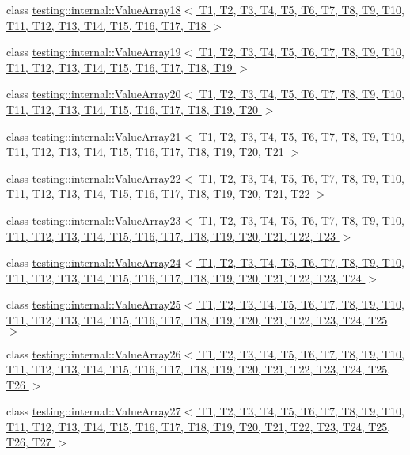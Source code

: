 \begin{DoxyCompactItemize}
\item 
class \hyperlink{classtesting_1_1internal_1_1_value_array18}{testing\-::internal\-::\-Value\-Array18$<$ T1, T2, T3, T4, T5, T6, T7, T8, T9, T10, T11, T12, T13, T14, T15, T16, T17, T18 $>$}
\item 
class \hyperlink{classtesting_1_1internal_1_1_value_array19}{testing\-::internal\-::\-Value\-Array19$<$ T1, T2, T3, T4, T5, T6, T7, T8, T9, T10, T11, T12, T13, T14, T15, T16, T17, T18, T19 $>$}
\item 
class \hyperlink{classtesting_1_1internal_1_1_value_array20}{testing\-::internal\-::\-Value\-Array20$<$ T1, T2, T3, T4, T5, T6, T7, T8, T9, T10, T11, T12, T13, T14, T15, T16, T17, T18, T19, T20 $>$}
\item 
class \hyperlink{classtesting_1_1internal_1_1_value_array21}{testing\-::internal\-::\-Value\-Array21$<$ T1, T2, T3, T4, T5, T6, T7, T8, T9, T10, T11, T12, T13, T14, T15, T16, T17, T18, T19, T20, T21 $>$}
\item 
class \hyperlink{classtesting_1_1internal_1_1_value_array22}{testing\-::internal\-::\-Value\-Array22$<$ T1, T2, T3, T4, T5, T6, T7, T8, T9, T10, T11, T12, T13, T14, T15, T16, T17, T18, T19, T20, T21, T22 $>$}
\item 
class \hyperlink{classtesting_1_1internal_1_1_value_array23}{testing\-::internal\-::\-Value\-Array23$<$ T1, T2, T3, T4, T5, T6, T7, T8, T9, T10, T11, T12, T13, T14, T15, T16, T17, T18, T19, T20, T21, T22, T23 $>$}
\item 
class \hyperlink{classtesting_1_1internal_1_1_value_array24}{testing\-::internal\-::\-Value\-Array24$<$ T1, T2, T3, T4, T5, T6, T7, T8, T9, T10, T11, T12, T13, T14, T15, T16, T17, T18, T19, T20, T21, T22, T23, T24 $>$}
\item 
class \hyperlink{classtesting_1_1internal_1_1_value_array25}{testing\-::internal\-::\-Value\-Array25$<$ T1, T2, T3, T4, T5, T6, T7, T8, T9, T10, T11, T12, T13, T14, T15, T16, T17, T18, T19, T20, T21, T22, T23, T24, T25 $>$}
\item 
class \hyperlink{classtesting_1_1internal_1_1_value_array26}{testing\-::internal\-::\-Value\-Array26$<$ T1, T2, T3, T4, T5, T6, T7, T8, T9, T10, T11, T12, T13, T14, T15, T16, T17, T18, T19, T20, T21, T22, T23, T24, T25, T26 $>$}
\item 
class \hyperlink{classtesting_1_1internal_1_1_value_array27}{testing\-::internal\-::\-Value\-Array27$<$ T1, T2, T3, T4, T5, T6, T7, T8, T9, T10, T11, T12, T13, T14, T15, T16, T17, T18, T19, T20, T21, T22, T23, T24, T25, T26, T27 $>$}
\item 

\end{DoxyCompactItemize}
